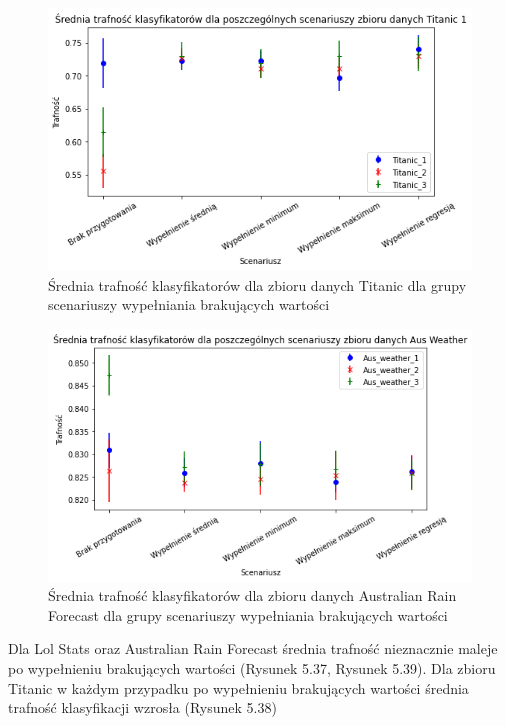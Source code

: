 \documentclass{book}
\begin{document}
\begin{figure}[H]
    \centerline{\includegraphics[scale=0.8]{Titanic_Avg_Wypełnienie_brakujących}}
    \centering
    \caption{Średnia trafność klasyfikatorów dla zbioru danych Titanic 
    dla grupy scenariuszy wypełniania brakujących wartości}
    \end{figure}

\begin{figure}[H]
    \centerline{\includegraphics[scale=0.8]{Aus_Weather_Avg_Wypełnienie_brakujących}}
    \centering
    \caption{Średnia trafność klasyfikatorów dla zbioru danych Australian Rain Forecast 
    dla grupy scenariuszy wypełniania brakujących wartości}
    \end{figure}


    Dla Lol Stats oraz Australian Rain Forecast średnia trafność nieznacznie maleje po wypełnieniu brakujących wartości (Rysunek 5.37, Rysunek 5.39). 
    Dla zbioru Titanic w każdym przypadku po wypełnieniu brakujących wartości średnia trafność klasyfikacji wzrosła (Rysunek 5.38)
\end{document}
